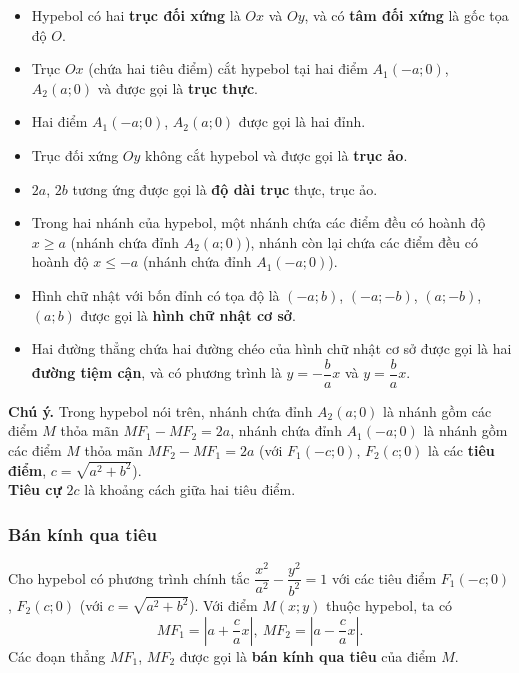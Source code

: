 \begin{itemize}
    \item Hypebol có hai \textbf{trục đối xứng} là $ Ox $ và $ Oy $, và có \textbf{tâm đối xứng} là gốc tọa độ $ O $.
    \item Trục $ Ox $ (chứa hai tiêu điểm) cắt hypebol tại hai điểm $ A_1(-a; 0) $, $ A_2(a; 0) $ và được gọi là \textbf{trục thực}.
    \item Hai điểm $ A_1(-a; 0) $, $ A_2(a; 0) $ được gọi là hai đỉnh.
    \item Trục đối xứng $ Oy $ không cắt hypebol và được gọi là \textbf{trục ảo}.
    \item $ 2a $, $ 2b $ tương ứng được gọi là \textbf{độ dài trục} thực,  trục ảo.
    \item Trong hai nhánh của hypebol, một nhánh chứa các điểm đều  có hoành độ $ x\ge a $ (nhánh chứa đỉnh $ A_2(a; 0) $), nhánh còn lại chứa các điểm đều có hoành độ $ x\le -a $ (nhánh chứa đỉnh $ A_1(-a; 0) $).
    \item Hình chữ nhật với bốn đỉnh có tọa độ là $ (-a; b) $, $ (-a; -b) $, $ (a; -b) $, $ (a; b) $ được gọi là \textbf{hình chữ nhật cơ sở}.
    \item Hai đường thẳng chứa hai đường chéo của hình chữ nhật cơ sở được gọi là hai \textbf{đường tiệm cận}, và có phương trình là $ y=-\dfrac{b}{a}x $ và $ y=\dfrac{b}{a}x $.
\end{itemize}
\begin{note}
    \textbf{Chú ý.}
    Trong hypebol nói trên, nhánh chứa đỉnh $ A_2(a; 0) $ là nhánh gồm các điểm $ M $ thỏa mãn $ MF_1-MF_2=2a $, nhánh chứa đỉnh $ A_1(-a; 0) $ là nhánh gồm các điểm $ M $ thỏa mãn $ MF_2-MF_1=2a $ (với $ F_1(-c; 0) $, $ F_2(c; 0) $ là các \textbf{tiêu điểm}, $ c=\sqrt{a^2+b^2} $).\\
    \textbf{Tiêu cự} $ 2c $ là khoảng cách giữa hai tiêu điểm.
\end{note} 
\subsubsection{Bán kính qua tiêu}
Cho hypebol có phương trình chính tắc $ \dfrac{x^2}{a^2}-\dfrac{y^2}{b^2}=1 $ với các tiêu điểm $ F_1(-c; 0) $, $ F_2(c; 0) $ (với $ c=\sqrt{a^2+b^2} $). Với điểm $ M(x; y) $ thuộc hypebol, ta có 
$$ MF_1=\left|a+\dfrac{c}{a}x\right|,\ MF_2=\left|a-\dfrac{c}{a}x\right|. $$
Các đoạn thẳng $ MF_1 $, $ MF_2 $ được gọi là \textbf{bán kính qua tiêu} của điểm $ M $.

